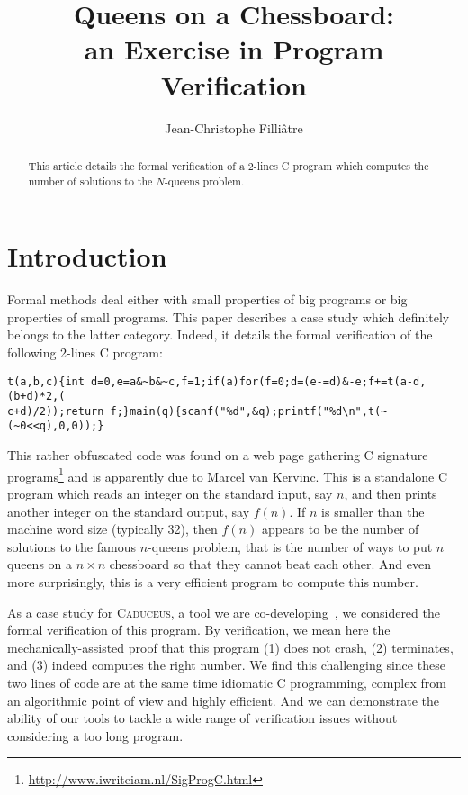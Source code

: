 \documentclass[a4paper]{llncs}
\newcommand{\caduceus}{\textsc{Caduceus}}
\begin{document}
\title{Queens on a Chessboard: \\
       an Exercise in Program Verification}
\author{Jean-Christophe Filli\^atre}
\maketitle

\begin{abstract}
  This article details the formal verification of a 2-lines C program
  which computes the number of solutions to the $N$-queens problem.
\end{abstract}

\section{Introduction}

Formal methods deal either with small properties of big programs or
big properties of small programs. This paper describes a case study
which definitely belongs to the latter category.
Indeed, it details the formal verification of the following 2-lines C program:
{\small%
\begin{verbatim}
t(a,b,c){int d=0,e=a&~b&~c,f=1;if(a)for(f=0;d=(e-=d)&-e;f+=t(a-d,(b+d)*2,(
c+d)/2));return f;}main(q){scanf("%d",&q);printf("%d\n",t(~(~0<<q),0,0));}
\end{verbatim}}
\noindent 
This rather obfuscated code was found on a web page gathering C signature
programs\footnote{\url{http://www.iwriteiam.nl/SigProgC.html}} and is
apparently due to Marcel van Kervinc. This is a standalone C program
which reads an integer on the standard input, say $n$, and then prints another
integer on the standard output, say $f(n)$. If $n$ is smaller than the
machine word size (typically 32), then
$f(n)$ appears to be the number of solutions to the famous $n$-queens
problem, that is the number of ways to put $n$ queens on a $n\times n$
chessboard so that they cannot beat each other. And even more
surprisingly, this is a very efficient program to compute this number.

As a case study for \caduceus, a tool we are
co-developing~\cite{caduceus}, we considered 
the formal verification of this program. By verification, we mean here
the mechanically-assisted proof that this program (1) does not crash, 
(2) terminates, and (3) indeed computes the right number. We find this
challenging since these two lines of code are at the same time idiomatic C
programming, complex from an algorithmic point of view and highly
efficient. And we can demonstrate the ability of our tools to tackle
a wide range of verification issues without considering a too long
program. 
\end{document}
